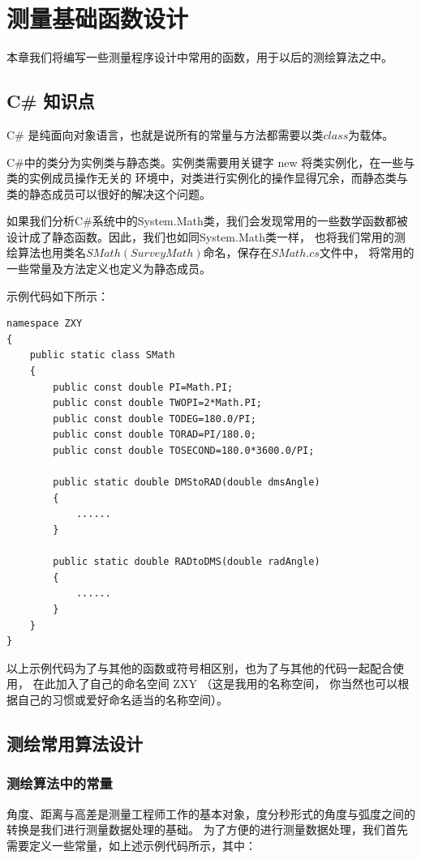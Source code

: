 
\chapter{测量基础函数设计}

本章我们将编写一些测量程序设计中常用的函数，用于以后的测绘算法之中。

\section{C\# 知识点}

C\# 是纯面向对象语言，也就是说所有的常量与方法都需要以类$class$为载体。

C\#中的类分为实例类与静态类。实例类需要用关键字 new 将类实例化，在一些与类的实例成员操作无关的
环境中，对类进行实例化的操作显得冗余，而静态类与类的静态成员可以很好的解决这个问题。 

如果我们分析C\#系统中的System.Math类，我们会发现常用的一些数学函数都被设计成了静态函数。因此，我们也如同System.Math类一样，
也将我们常用的测绘算法也用类名$SMath(SurveyMath)$命名，保存在$SMath.cs$文件中，
将常用的一些常量及方法定义也定义为静态成员。

示例代码如下所示：
\begin{lstlisting}
namespace ZXY
{
    public static class SMath
    {
        public const double PI=Math.PI;
        public const double TWOPI=2*Math.PI;
        public const double TODEG=180.0/PI; 
        public const double TORAD=PI/180.0;
        public const double TOSECOND=180.0*3600.0/PI;
    
        public static double DMStoRAD(double dmsAngle)
        {
            ......
        }
    
        public static double RADtoDMS(double radAngle)
        {
            ......
        }
    }
}
\end{lstlisting}

以上示例代码为了与其他的函数或符号相区别，也为了与其他的代码一起配合使用，
在此加入了自己的命名空间 ZXY （这是我用的名称空间，
你当然也可以根据自己的习惯或爱好命名适当的名称空间）。


\section{测绘常用算法设计}

\subsection{测绘算法中的常量}
角度、距离与高差是测量工程师工作的基本对象，度分秒形式的角度与弧度之间的转换是我们进行测量数据处理的基础。
为了方便的进行测量数据处理，我们首先需要定义一些常量，如上述示例代码所示，其中：

